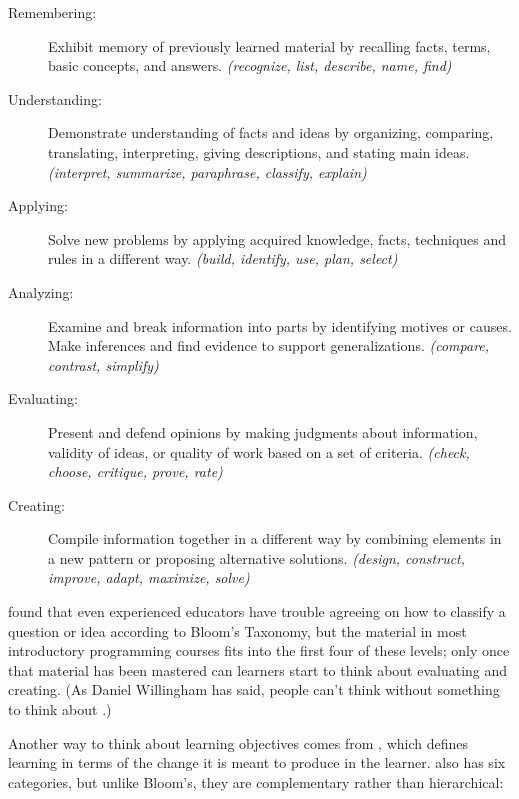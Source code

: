 \begin{description}
\item[Remembering:]
Exhibit memory of previously learned material by recalling facts,
terms, basic concepts, and answers. \emph{(recognize, list, describe,
name, find)}
\item[Understanding:]
Demonstrate understanding of facts and ideas by organizing,
comparing, translating, interpreting, giving descriptions, and
stating main ideas. \emph{(interpret, summarize, paraphrase, classify,
explain)}
\item[Applying:]
Solve new problems by applying acquired knowledge, facts, techniques
and rules in a different way. \emph{(build, identify, use, plan, select)}
\item[Analyzing:]
Examine and break information into parts by identifying motives or
causes. Make inferences and find evidence to support
generalizations. \emph{(compare, contrast, simplify)}
\item[Evaluating:]
Present and defend opinions by making judgments about information,
validity of ideas, or quality of work based on a set of criteria.
\emph{(check, choose, critique, prove, rate)}
\item[Creating:]
Compile information together in a different way by combining
elements in a new pattern or proposing alternative solutions.
\emph{(design, construct, improve, adapt, maximize, solve)}
\end{description}

\cite{Masa2018} found that even experienced educators have trouble
agreeing on how to classify a question or idea according to Bloom's
Taxonomy, but the material in most introductory programming courses
fits into the first four of these levels; only once that material has
been mastered can learners start to think about evaluating and
creating. (As Daniel Willingham has said, people can't think without
something to think about \cite{Will2010}.)

Another way to think about learning objectives comes from
\cite{Fink2013}, which defines learning in terms of the change it
is meant to produce in the learner.  also has six categories, but unlike
Bloom's, they are complementary rather than hierarchical:

